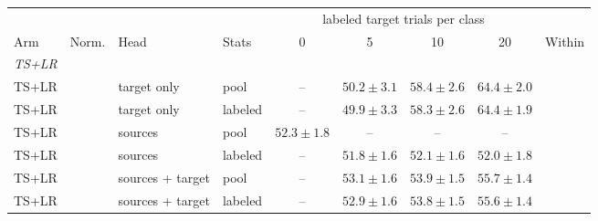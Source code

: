 \begin{tabular}{llllccccc}
\toprule
 & & & & \multicolumn{4}{c}{labeled target trials per class} & \\
\cmidrule(lr){5-8}
Arm & Norm. & Head & Stats & 0 & 5 & 10 & 20 & Within \\
\midrule
\multicolumn{9}{l}{\emph{TS+LR}} \\
TS+LR &  & target only & pool & -- & $50.2 \pm 3.1$ & $\mathbf{58.4} \pm 2.6$ & $\mathbf{64.4} \pm 2.0$ &  \\
TS+LR &  & target only & labeled & -- & $49.9 \pm 3.3$ & $58.3 \pm 2.6$ & $64.4 \pm 1.9$ &  \\
TS+LR &  & sources & pool & $\mathbf{52.3} \pm 1.8$ & -- & -- & -- &  \\
TS+LR &  & sources & labeled & -- & $51.8 \pm 1.6$ & $52.1 \pm 1.6$ & $52.0 \pm 1.8$ &  \\
TS+LR &  & sources + target & pool & -- & $\mathbf{53.1} \pm 1.6$ & $53.9 \pm 1.5$ & $55.7 \pm 1.4$ &  \\
TS+LR &  & sources + target & labeled & -- & $52.9 \pm 1.6$ & $53.8 \pm 1.5$ & $55.6 \pm 1.4$ &  \\
\bottomrule
\end{tabular}
